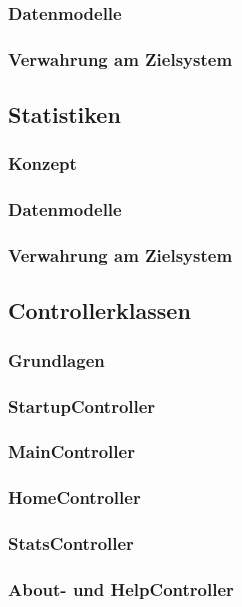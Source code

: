 \subsubsection{Datenmodelle}
\subsubsection{Verwahrung am Zielsystem}

\subsection{Statistiken}
\subsubsection{Konzept}
\subsubsection{Datenmodelle}
\subsubsection{Verwahrung am Zielsystem}

\subsection{Controllerklassen}
\subsubsection{Grundlagen}
\subsubsection{StartupController}
\subsubsection{MainController}
\subsubsection{HomeController}
\subsubsection{StatsController}
\subsubsection{About- und HelpController}



